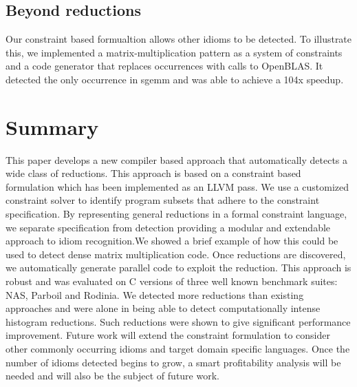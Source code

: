 
\subsection{Beyond reductions}

Our constraint based formualtion allows other idioms to be detected. To 
illustrate this, we implemented a matrix-multiplication pattern as a 
system of constraints and a code generator that
replaces occurrences with calls to OpenBLAS. 
It detected the only occurrence in sgemm and was able to achieve a 104x speedup.

\section{Summary}

This paper develops a new compiler based approach that
automatically detects a wide class of reductions. 
This approach is based on a constraint based formulation which has
been implemented as an LLVM pass. We use a customized constraint
solver to identify program subsets that adhere to the constraint
specification.  By representing general reductions in a formal
constraint language, we separate specification from detection
providing a modular and extendable approach to idiom recognition.We
showed a brief example of how this could be used to detect dense
matrix multiplication code.  Once reductions are discovered, we
automatically generate parallel code to exploit the reduction. This
approach is robust and was evaluated on C versions of three well known
benchmark suites: NAS, Parboil and Rodinia. We detected 
more reductions than existing approaches and were alone in being able
to detect computationally intense  histogram reductions. Such
reductions were shown to give significant performance improvement.
Future work will extend the constraint formulation to consider other
commonly occurring idioms and target domain specific languages. Once the number of idioms detected begins to grow, a smart profitability analysis will be needed and will also be the subject of future work.


